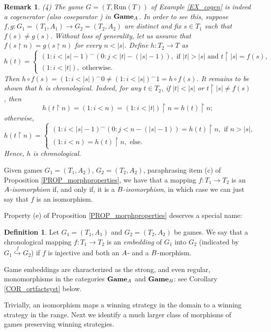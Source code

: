 \documentclass[12pt]{amsart}
\newtheorem{remark}[thm]{Remark}
\theoremstyle{definition}
\newtheorem{defn}[thm]{Definition}
\newcommand{\seq}[1]{{\left( {#1} \right)}}
\newcommand{\A}{\textup{\textmd{\textsc{A}}}}
\newcommand{\B}{\textup{\textmd{\textsc{B}}}}
\newcommand{\Run}{{\mathrm{Run}}}
\DeclareMathOperator{\restrict}{\upharpoonright}
\DeclareMathOperator{\embed}{\hookrightarrow}
\newcommand{\Games}{\mathbf{Game}}
\begin{document}
\begin{remark}
	\emph{(4)} The game $G=(T,\Run(T))$ of {\rm Example \ref{EX_cogen}} is indeed a cogenerator (also coseparator \cite{Adamek1990}) in $\Games_{\rm A}$. In order to see this, suppose $f,g\colon G_1=(T_1,A_1)\to G_2=(T_2,A_2)$ are distinct and fix $s\in T_1$ such that $f(s)\neq g(s)$. Without loss of generality, let us assume that $f(s\restrict n)=g(s\restrict n)$ for every $n<|s|$. Define $h\colon T_2\to T$ as
	\[
	h(t) = \begin{cases}
		\seq{1:i<|s|-1}^\smallfrown \seq{0:j<|t|-(|s|-1)}, \text{ if $|t|>|s|$ and $t\restrict |s| = f(s)$},\\
		\seq{1:i<|t|}, \text{ otherwise}.
	\end{cases}
	\]
	Then $h\circ f(s) = \seq{1:i<|s|}^\smallfrown 0\neq \seq{1:i<|s|}^\smallfrown 1 = h\circ f(s)$. It remains to be shown that $h$ is chronological. Indeed, for any $t\in T_2$, if $|t|<|s|$ or  $t\restrict |s|\neq f(s)$, then 
	\[
	h(t\restrict n) = \seq{1:i<n} = \seq{1:i<|t|}\restrict n = h(t)\restrict n;
	\]
	otherwise,
	\[
	h(t\restrict n) = \begin{cases}
		\seq{1:i<|s|-1}^\smallfrown \seq{0:j<n-(|s|-1)} = h(t)\restrict n, \text{ if $n>|s|$},\\
		\seq{1:i<n} = h(t)\restrict n, \text{ else}.
	\end{cases}
	\]
	Hence, $h$ is chronological.
\end{remark}


Given games $G_1=(T_1, A_2)$, $G_2=(T_2, A_2)$, paraphrasing item (c) of Proposition \ref{PROP_morphproperties}, we have that a mapping $f\colon T_1\to T_2$ is an $\A$-\textit{isomorphism} if, and only if, it is a $\B$-\textit{isomorphism}, in which case we can just say that $f$ is an isomorphism.

Property (e) of Proposition \ref{PROP_morphproperties} deserves a special name:


\begin{defn}\label{DEF_Emb}
	Let $G_1=(T_1,A_1)$ and $G_2=(T_2,A_2)$ be games. We say that a chronological mapping $f\colon T_1\to T_2$ is an \textit{embedding} of $G_1$ into $G_2$ {(indicated by $G_1\stackrel{f}{\embed}G_2$)} if $f$ is injective and both an $\A$- and a $\B$-morphism.
\end{defn}


Game embeddings are characterized as the strong, and even regular, monomorphisms in the categories $\Games_{\A}$ and $\Games_\B$: see Corollary \ref{COR_ortfactsyst} below.

\medskip
Trivially, an isomorphism maps a winning strategy in the domain to a winning strategy in the range. Next we identify a much larger class of morphisms of games preserving winning strategies.	
\end{document}
